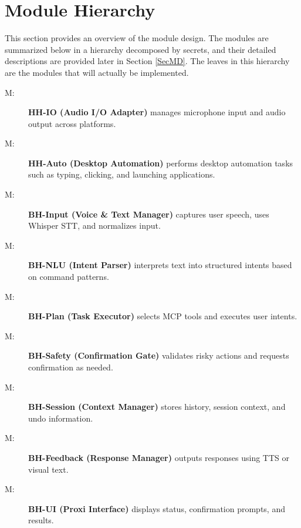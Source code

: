 \documentclass[12pt, titlepage]{article}
\newcounter{mnum}
\newcommand{\mthemnum}{M\themnum}
\begin{document}
\section{Module Hierarchy} \label{SecMH}

This section provides an overview of the module design. The modules are
summarized below in a hierarchy decomposed by secrets, and their detailed
descriptions are provided later in Section \ref{SecMD}. The leaves in this
hierarchy are the modules that will actually be implemented.

\begin{description}

  \item [ \mthemnum \label{mHHIO}:]
  \textbf{HH-IO (Audio I/O Adapter)} manages microphone input and audio output
  across platforms.
  \item [ \mthemnum \label{mHHAuto}:]
  \textbf{HH-Auto (Desktop Automation)} performs desktop automation tasks such
  as typing, clicking, and launching applications.

  \item [ \mthemnum \label{mBHInput}:]
  \textbf{BH-Input (Voice \& Text Manager)} captures user speech, uses Whisper
  STT, and normalizes input.
  \item [ \mthemnum \label{mBHNLU}:]
  \textbf{BH-NLU (Intent Parser)} interprets text into structured intents based
  on command patterns.
  \item [ \mthemnum \label{mBHPlan}:]
  \textbf{BH-Plan (Task Executor)} selects MCP tools and executes user
  intents.
  \item [ \mthemnum \label{mBHSafety}:]
  \textbf{BH-Safety (Confirmation Gate)} validates risky actions and requests
  confirmation as needed.
  \item [ \mthemnum \label{mBHSession}:]
  \textbf{BH-Session (Context Manager)} stores history, session context, and
  undo information.
  \item [ \mthemnum \label{mBHFeedback}:]
  \textbf{BH-Feedback (Response Manager)} outputs responses using TTS or visual
  text.
  \item [ \mthemnum \label{mBHUI}:]
  \textbf{BH-UI (Proxi Interface)} displays status, confirmation prompts, and
  results.


\end{description}
\end{document}

